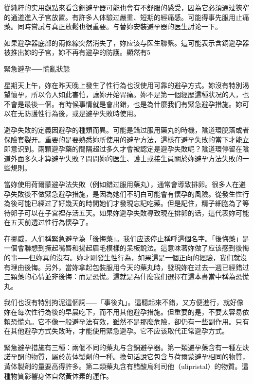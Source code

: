 \documentclass[12pt,UTF8]{ctexbook}
\begin{document}
從純粹的实用觀點來看含銅避孕器可能也會有不舒服的感受，因為它必須通过狹窄的通道進入子宮放置。有許多人体驗过嚴重、短期的經痛感。可能得事先服用止痛藥。同時嘗試与真正放鬆也很重要。与替妳安裝避孕器的医生討论一下。

如果避孕器底部的兩條線突然消失了，妳应该与医生聯繫。這可能表示含銅避孕器被推出妳的子宮，妳不再有避孕的防護。顯然有5%





緊急避孕⸺慌亂狀態




星期天上午，妳在昨天晚上發生了性行為也沒使用可靠的避孕方式。妳沒有特別渴望懷孕，所以令人如此害怕，讓妳开始胃痛。妳不是第一個經歷這種状况的人，也不會是最後一個。有時候事情就是會出錯，也是為什麼我们有緊急避孕措施。妳可以在无防護性行為後，或是避孕失敗時使用。

避孕失敗的定義因避孕的種類而異。可能是錯过服用藥丸的時機，陰道環脫落或者保險套裂开。重要的是要熟悉妳所使用的避孕方法，這樣在避孕失敗的當下才能立即意识到。兩顆避孕藥的間隔超过多久才會被認定是避孕失敗呢？陰道環停留在陰道外面多久才算避孕失敗？問問妳的医生、護士或接生員關於妳避孕方法失敗的一些規則。

當妳使用荷爾蒙避孕法失敗（例如錯过服用藥丸），通常會導致排卵。很多人在避孕失敗後不做緊急避孕措施，是因為她们不明白可能會有懷孕的風險。從發生性行為後可能已經过了好幾天的時間她们才發現忘記吃藥。但是記住，精子細胞為了等待卵子可以在子宮裡存活五天。如果妳避孕失敗導致現在排卵的话，這代表妳可能在五天前透过性行為懷孕了。

在挪威，人们稱緊急避孕為「後悔藥」。我们应该停止稱呼這個名字。「後悔藥」是一個會聯想到撅起嘴唇和揚起眉毛模樣的呆板說法。這意味著妳做了应该感到後悔的事⸺但妳真的沒有。妳才剛發生性行為，如果這是一個正向的經驗，我们就沒有理由後悔。另外，當妳拿起包裝服用今天的藥丸時，發現妳在过去一週已經錯过三顆藥的心情並非後悔：而是恐慌。這就是為什麼我们選擇在這本書當中稱為恐慌丸。

我们也沒有特別拘泥這個詞⸺「事後丸」。這聽起來不錯，又方便進行，就好像妳在每次性行為後的早晨吃下，而不用其他避孕措施。但重要的是，不要太容易依賴恐慌丸。它不像一般避孕法有效，雖然不是那麼危險，卻仍有一些副作用。只有在其他避孕方式失敗時，才能使用緊急避孕。它不应该取代正常避孕方式。

緊急避孕措施有三種：兩個不同的藥丸与含銅避孕器。第一類避孕藥含有一種左炔諾孕酮的物質，屬於黃体製劑的一種。換句话說它包含与荷爾蒙避孕相同的物質，黃体製劑的量要高得許多。第二類藥丸含有醋酸烏利司他（ulipristal）的物質。這種物質影響身体自然黃体素的運作。
\end{document}
